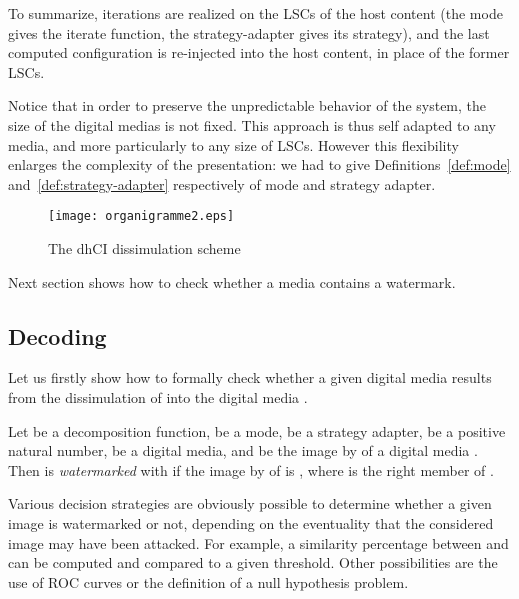 \documentclass{comjnl}
\begin{document}
To summarize, iterations are realized on the LSCs of the
host content
(the mode gives the iterate function,  
the strategy-adapter gives its strategy), 
and the last computed configuration is re-injected into the host content, 
in place of the former LSCs.
























Notice that in order to preserve the unpredictable behavior of the system, 
the size of the digital medias is not fixed.
This approach is thus self adapted to any media, and more particularly to
any size of LSCs. 
However this flexibility enlarges the complexity of the presentation: 
we had to give Definitions~\ref{def:mode} and~\ref{def:strategy-adapter} 
respectively of mode and strategy adapter.

\begin{figure}[ht]
\centering
\texttt{[image: organigramme2.eps]}
\caption{The dhCI dissimulation scheme}
\label{fig:organigramme}
\end{figure}


Next section shows how to check whether a media contains a watermark.


\subsection{Decoding}\label{sub:wmdecoding}

Let us firstly show how to formally check whether a given digital media  
results from the dissimulation of  into the digital media . 



\begin{definition}
Let  be a decomposition function,
 be a mode, 
 be a strategy adapter, 
 be a positive natural number,  
 be a digital media, and 
 be the 
image by   of  a digital media . 
Then  is \emph{watermarked} with  if
the image by  of  is 
, where 
 is the right member of .
\end{definition}


Various decision strategies are obviously  possible to determine whether a given
image  is watermarked or not, depending  on the eventuality
that the considered image may have  been attacked.
For example, a  similarity percentage between 
and   can  be  computed and compared  to a  given
threshold. Other  possibilities are the use of  ROC curves or
the definition of a null hypothesis problem.
\end{document}
